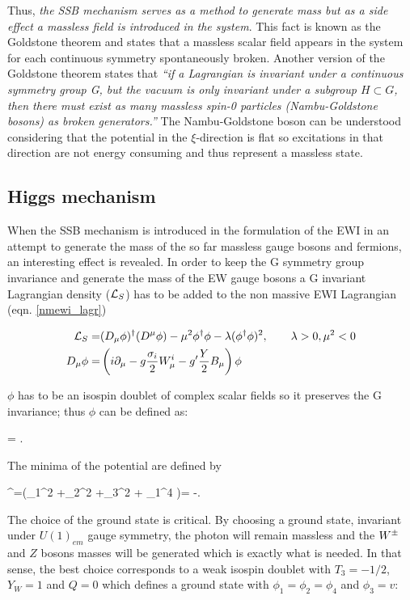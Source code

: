 \noindent Thus, \textit {the SSB mechanism serves as a method to generate mass but as a side effect a massless field is introduced in the system}. This fact is known as the Goldstone theorem and states that a massless scalar field appears in the system for each continuous symmetry spontaneously broken. Another version of the Goldstone theorem states that \textit{``if a Lagrangian is invariant under a continuous symmetry group G, but the vacuum is only invariant under a subgroup $H\subset G$, then there must exist as many massless spin-0 particles (Nambu-Goldstone bosons) as broken generators.''}\cite{pich} The Nambu-Goldstone boson can be understood considering that the potential in the $\xi$-direction is flat so excitations in that direction are not energy consuming and thus represent a massless state.                   


\subsection{Higgs mechanism}

\noindent When the SSB mechanism is introduced in the formulation of the EWI in an attempt to generate the mass of the so far massless gauge bosons and fermions, an interesting effect is revealed. In order to keep the G symmetry group invariance and generate the mass of the EW gauge bosons a G invariant Lagrangian density ($\mathcal{L}_S$) has to be added to the non massive EWI Lagrangian (eqn. \ref{nmewi_lagr})

\begin{align}
\mathcal{L}_S    = &(D_\mu\phi)^\dagger(D^\mu\phi) - \mu^2\phi^\dagger\phi - \lambda(\phi^\dagger\phi)^2 , \qquad \lambda>0, \mu^2<0 \label{ls}\\
D_\mu\phi = &\left(i\partial_\mu - g\frac{\sigma_i}{2}W^i_\mu -
g'\frac{Y}{2}B_\mu\right)\phi
\end{align}

\noindent $\phi$ has to be an isospin doublet of complex scalar fields so it preserves the G invariance; thus $\phi$ can be defined as:

\beqn
\phi =  \equiv {}.
\eeqn

\noindent The minima of the potential are defined by

\beqn
\phi^\dagger\phi=(\phi_1^2 +\phi_2^2 +\phi_3^2 + \phi_1^4 )= -.
\eeqn

\noindent The choice of the ground state is critical. By choosing a ground state, invariant under $U(1)_{em}$ gauge symmetry, the photon will remain massless and the $W^\pm$ and $Z$ bosons masses will be generated which is exactly what is needed. In that sense, the best choice corresponds to a weak isospin doublet with $T_3=-1/2$, $Y_W=1$ and $Q=0$ which defines a ground state with $\phi_1=\phi_2=\phi_4$ and $\phi_3=v$:

